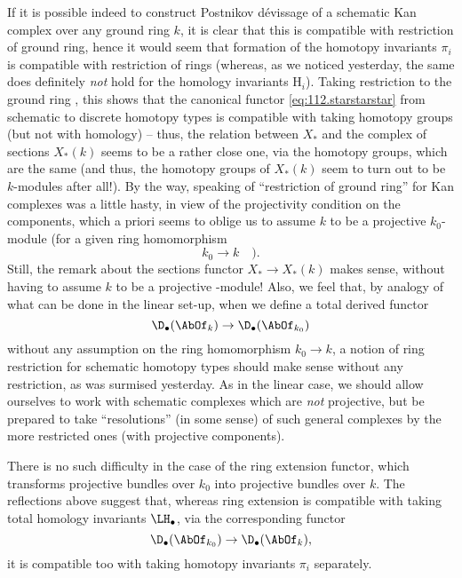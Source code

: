 If it is possible indeed to construct Postnikov dévissage
of a schematic Kan complex over any ground ring $k$, it is clear that
this is compatible with restriction of ground ring, hence it would
seem that formation of the homotopy invariants $\pi_i$ is compatible
with restriction of rings (whereas, as we noticed yesterday, the same
does definitely \emph{not} hold for the homology invariants $\mathrm
H_i$). Taking restriction to the ground ring \bZ, this shows that the
canonical functor \eqref{eq:112.starstarstar} from schematic to
discrete homotopy types is compatible with taking homotopy groups (but
not with homology) -- thus, the relation between $X_*$ and the complex
of sections $X_*(k)$ seems to be a rather close one, via the homotopy
groups, which are the same (and thus, the homotopy groups of $X_*(k)$
seem to turn out to be $k$-modules after all!). By the way, speaking
of ``restriction of ground ring'' for Kan complexes was a little
hasty, in view of the projectivity condition on the components, which
a priori seems to oblige us to assume $k$ to be a projective
$k_0$-module (for a given ring homomorphism
\[k_0\to k\quad\text{).}\]
Still, the remark about the sections functor $X_*\to X_*(k)$ makes
sense, without having to assume $k$ to be a projective \bZ-module!
Also, we feel that, by analogy of what can be done in the linear
set-up, when we define a total derived functor
\[\D_\bullet(\AbOf_k) \to \D_\bullet(\AbOf_{k_0})\]
without any assumption on the ring homomorphism $k_0\to k$, a notion
of ring restriction for schematic homotopy types should make sense
without any restriction, as was surmised yesterday. As in the linear
case, we should allow ourselves to work with schematic complexes which
are \emph{not} projective, but be prepared to take ``resolutions'' (in
some sense) of such general complexes by the more restricted ones
(with projective components).

There is no such difficulty in the case of the ring extension functor,
which transforms projective bundles over $k_0$ into projective bundles
over $k$. The reflections above suggest that, whereas ring extension
is compatible with taking total homology invariants $\LH_\bullet$, via
the corresponding functor
\[\D_\bullet(\AbOf_{k_0}) \to \D_\bullet(\AbOf_k),\]
it is compatible too with taking homotopy invariants $\pi_i$
separately.

\bigbreak

\presectionfill{}\par

